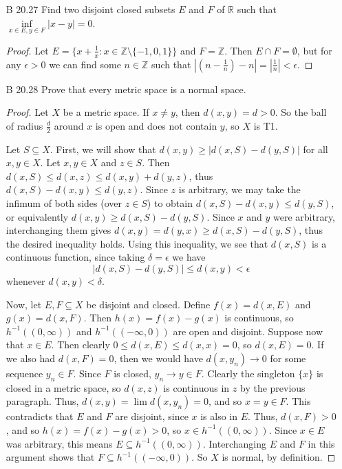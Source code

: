 \documentclass[10pt]{article}
\newcommand{\Z}{\mathbb{Z}}
\newcommand{\R}{\mathbb{R}}
\begin{document}
\begin{enumerate}
\item[B 20.27] Find two disjoint closed subsets $E$ and $F$ of $\R$ such that $\inf\limits_{x \in E, y \in F} |x-y| = 0$.

\begin{proof}
Let $E = \{ x + \frac{1}{x} : x \in \Z \setminus \{-1,0,1\} \}$ and $F = \Z$.  Then $E \cap F = \emptyset$, but for any $\epsilon > 0$ we can find some $n \in \Z$ such that $|(n - \frac{1}{n}) - n| = |\frac{1}{n}| < \epsilon$.
\end{proof}

\item[B 20.28] Prove that every metric space is a normal space.

\begin{proof}
Let $X$ be a metric space.  If $x \neq y$, then $d(x,y) = d > 0$.  So the ball of radius $\frac{d}{2}$ around $x$ is open and does not contain $y$, so $X$ is T1.

Let $S \subseteq X$.  First, we will show that $d(x,y) \geq |d(x,S) - d(y,S)|$ for all $x,y \in X$.  Let $x,y \in X$ and $z \in S$.  Then $d(x,S) \leq d(x,z) \leq d(x,y) + d(y,z)$, thus $d(x,S) - d(x,y) \leq d(y,z)$.  Since $z$ is arbitrary, we may take the infimum of both sides (over $z \in S$) to obtain
$d(x,S) - d(x,y) \leq d(y,S)$, or equivalently $d(x,y) \geq d(x,S) - d(y,S)$.  Since $x$ and $y$ were arbitrary, interchanging them gives $d(x,y) = d(y,x) \geq d(x,S) - d(y,S)$, thus the desired inequality holds.  Using this inequality, we see that $d(x,S)$ is a continuous function, since taking $\delta = \epsilon$ we have
$$
|d(x,S) - d(y,S)| \leq d(x,y) < \epsilon
$$
whenever $d(x,y) < \delta$.

Now, let $E,F \subseteq X$ be disjoint and closed.  Define $f(x) = d(x,E)$ and $g(x) = d(x,F)$.  Then $h(x) = f(x) - g(x)$ is continuous, so $h^{-1}((0,\infty))$ and $h^{-1}((-\infty, 0))$ are open and disjoint.  Suppose now that $x \in E$.  Then clearly $0 \leq d(x,E) \leq d(x,x) = 0$, so $d(x,E) = 0$.  If we also had $d(x,F) = 0$, then we would have $d(x,y_n) \rightarrow 0$ for some sequence $y_n \in F$.  Since $F$ is closed, $y_n \rightarrow y \in F$.  Clearly the singleton $\{x\}$ is closed in a metric space, so $d(x,z)$ is continuous in $z$ by the previous paragraph.  Thus, $d(x,y) = \lim d(x,y_n) = 0$, and so $x = y \in F$.  This contradicts that $E$ and $F$ are disjoint, since $x$ is also in $E$.  Thus, $d(x,F) > 0$, and so $h(x) = f(x) - g(x) > 0$, so $x \in h^{-1}((0,\infty))$.  Since $x \in E$ was arbitrary, this means $E \subseteq h^{-1}((0,\infty))$.  Interchanging $E$ and $F$ in this argument shows that $F \subseteq h^{-1}((-\infty,0))$.  So $X$ is normal, by definition.


\end{proof}
\end{enumerate}
\end{document}
